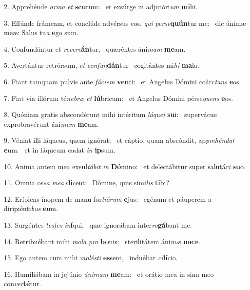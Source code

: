 2. Apprehénde \textit{ar}\textit{ma} \textit{et} \textbf{scu}tum: \ast\  et exsúrge in adjutóri\textit{um} \textbf{mi}hi.\

3. Effúnde frámeam, et conclúde advérsus eos, \textit{qui} \textit{per}\textit{se}\textbf{quún}tur me: \ast\  dic ánimæ meæ: Salus tu\textit{a} \textbf{e}go sum.\

4. Confundántur et \textit{re}\textit{ve}\textit{re}\textbf{án}tur, \ast\  quæréntes áni\textit{mam} \textbf{me}am.\

5. Avertántur retrórsum, \textit{et} \textit{con}\textit{fun}\textbf{dán}tur \ast\  cogitántes mi\textit{hi} \textbf{ma}la.\

6. Fiant tamquam pulvis ante \textit{fá}\textit{ci}\textit{em} \textbf{ven}ti: \ast\  et Angelus Dómini coárc\textit{tans} \textbf{e}os.\

7. Fiat via illórum té\textit{ne}\textit{bræ} \textit{et} \textbf{lú}bricum: \ast\  et Angelus Dómini pérse\textit{quens} \textbf{e}os.\

8. Quóniam gratis abscondérunt mihi intéritum \textit{lá}\textit{que}\textit{i} \textbf{su}i: \ast\  supervácue exprobravérunt áni\textit{mam} \textbf{me}am.\

9. Véniat illi láqueus, quem ignórat: \dag\  et cáptio, quam abscóndit, ap\textit{pre}\textit{hén}\textit{dat} \textbf{e}um: \ast\  et in láqueum cadat \textit{in} \textbf{ip}sum.\

10. Anima autem mea exsul\textit{tá}\textit{bit} \textit{in} \textbf{Dó}mino: \ast\  et delectábitur super salutá\textit{ri} \textbf{su}o.\

11. Omnia os\textit{sa} \textit{me}\textit{a} \textbf{di}cent: \ast\  Dómine, quis sími\textit{lis} \textbf{ti}bi?\

12. Erípiens ínopem de manu for\textit{ti}\textit{ó}\textit{rum} \textbf{e}jus: \ast\  egénum et páuperem a diripiénti\textit{bus} \textbf{e}um.\

13. Surgéntes \textit{tes}\textit{tes} \textit{in}\textbf{í}qui, \ast\  quæ ignorábam inter\textit{ro}\textbf{gá}bant me.\

14. Retribuébant mihi \textit{ma}\textit{la} \textit{pro} \textbf{bo}nis: \ast\  sterilitátem áni\textit{mæ} \textbf{me}æ.\

15. Ego autem cum mihi \textit{mo}\textit{lés}\textit{ti} \textbf{es}sent, \ast\  induébar \textit{ci}\textbf{lí}cio.\

16. Humiliábam in jejúnio \textit{á}\textit{ni}\textit{mam} \textbf{me}am: \ast\  et orátio mea in sinu meo con\textit{ver}\textbf{té}tur.\


